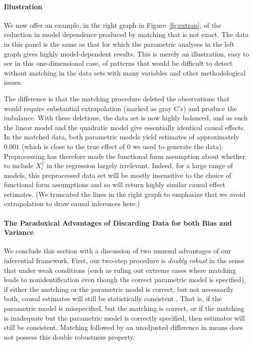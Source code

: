 \documentclass[11pt,titlepage]{article}
\begin{document}
\paragraph{Illustration}
We now offer an example, in the right graph in Figure~\ref{fg:extrap},
of the reduction in model dependence produced by matching that is not
exact.  The data in this panel is the same as that for which the
parametric analyses in the left graph gives highly model-dependent
results.  This is merely an illustration, easy to see in this
one-dimensional case, of patterns that would be difficult to detect
without matching in the data sets with many variables and other
methodological issues.

The difference is that the matching procedure deleted the observations
that would require substantial extrapolation (marked as gray C's) and
produce the imbalance.  With these deletions, the data set is now
highly balanced, and as such the linear model and the quadratic model
give essentially identical causal effects.  In the matched data, both
parametric models yield estimates of approximately $0.001$ (which is
close to the true effect of $0$ we used to generate the data).
Preprocessing has therefore made the functional form assumption about
whether to include $X_i^2$ in the regression largely irrelevant.
Indeed, for a large range of models, this preprocessed data set will
be mostly insensitive to the choice of functional form assumptions and
so will return highly similar causal effect estimates.  (We truncated
the lines in the right graph to emphasize that we avoid extrapolation
to draw causal inferences here.)

\paragraph{The Paradoxical Advantages of Discarding Data 
  for both Bias and Variance} We conclude this section with a
discussion of two unusual advantages of our inferential framework.
First, our two-step procedure is \emph{doubly robust} in the sense
that under weak conditions (such as ruling out extreme cases where
matching leads to nonidentification even though the correct parametric
model is specified), if either the matching or the parametric model is
correct, but not necessarily both, causal estimates will still be
statistically consistent \citep[see][]{RobRot01}.  That is, if the
parametric model is misspecified, but the matching is correct, or if
the matching is inadequate but the parametric model is correctly
specified, then estimates will still be consistent.  Matching followed
by an unadjusted difference in means does not possess this double
robustness property.
\end{document}
